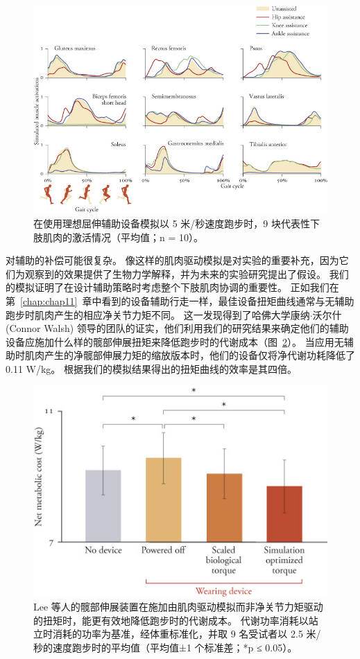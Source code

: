\begin{figure}[!htb]
	\centering
	\includegraphics[width=1.0\linewidth]{chap12/12_13}
	\caption{在使用理想屈伸辅助设备模拟以 5 米/秒速度跑步时，9 块代表性下肢肌肉的激活情况（平均值；n = 10）\cite{uchida2016simulating}。 \label{fig:12_13}}
\end{figure}


对辅助的补偿可能很复杂。
像这样的肌肉驱动模拟是对实验的重要补充，因为它们为观察到的效果提供了生物力学解释，并为未来的实验研究提出了假设。
我们的模拟证明了在设计辅助策略时考虑整个下肢肌肉协调的重要性。
正如我们在第~\ref{chap:chap11}~章中看到的设备辅助行走一样，最佳设备扭矩曲线通常与无辅助跑步时肌肉产生的相应净关节力矩不同。
这一发现得到了哈佛大学康纳$\cdot$沃尔什 (Connor Walsh) 领导的团队的证实，他们利用我们的研究结果来确定他们的辅助设备应施加什么样的髋部伸展扭矩来降低跑步时的代谢成本（图~\ref{fig:12_14}）。
当应用无辅助时肌肉产生的净髋部伸展力矩的缩放版本时，他们的设备仅将净代谢功耗降低了 0.11 W/kg。
根据我们的模拟结果得出的扭矩曲线的效率是其四倍。


\begin{figure}[!htb]
	\centering
	\includegraphics[width=0.8\linewidth]{chap12/12_14}
	\caption{Lee 等人的髋部伸展装置在施加由肌肉驱动模拟而非净关节力矩驱动的扭矩时，能更有效地降低跑步时的代谢成本。
		代谢功率消耗以站立时消耗的功率为基准，经体重标准化，并取 9 名受试者以 2.5 米/秒的速度跑步时的平均值（平均值±1 个标准差；*p ≤ 0.05）\cite{lee2017reducing}。 \label{fig:12_14}}
\end{figure}


